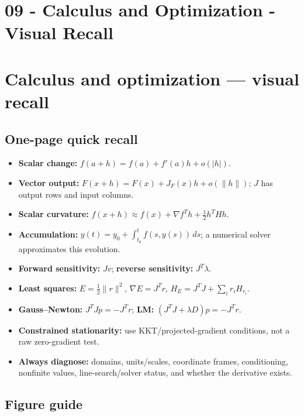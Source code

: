 \hypertarget{appendix-adf48f5dc5c1}{}
\section*{09 - Calculus and Optimization - Visual Recall}
\section{Calculus and optimization --- visual recall}\label{appendix-adf48f5dc5c1-calculus-and-optimization-visual-recall}

\subsection{One-page quick recall}\label{appendix-adf48f5dc5c1-one-page-quick-recall}

\begin{itemize}
\tightlist
\item
  \textbf{Scalar change:} \(f(a+h)=f(a)+f'(a)h+o(|h|)\).
\item
  \textbf{Vector output:} \(F(x+h)=F(x)+J_F(x)h+o(\|h\|)\); \(J\) has output rows and input columns.
\item
  \textbf{Scalar curvature:} \(f(x+h)\approx f(x)+\nabla f^T h+\tfrac12h^THh\).
\item
  \textbf{Accumulation:} \(y(t)=y_0+\int_{t_0}^t f(s,y(s))\,ds\); a numerical solver approximates this evolution.
\item
  \textbf{Forward sensitivity:} \(Jv\); \textbf{reverse sensitivity:} \(J^T\lambda\).
\item
  \textbf{Least squares:} \(E=\tfrac12\|r\|^2\), \(\nabla E=J^Tr\), \(H_E=J^TJ+\sum_i r_iH_{r_i}\).
\item
  \textbf{Gauss--Newton:} \(J^TJp=-J^Tr\); \textbf{LM:} \((J^TJ+\lambda D)p=-J^Tr\).
\item
  \textbf{Constrained stationarity:} use KKT/projected-gradient conditions, not a raw zero-gradient test.
\item
  \textbf{Always diagnose:} domains, units/scales, coordinate frames, conditioning, nonfinite values, line-search/solver status, and whether the derivative exists.
\end{itemize}

\subsection{Figure guide}\label{appendix-adf48f5dc5c1-figure-guide}

